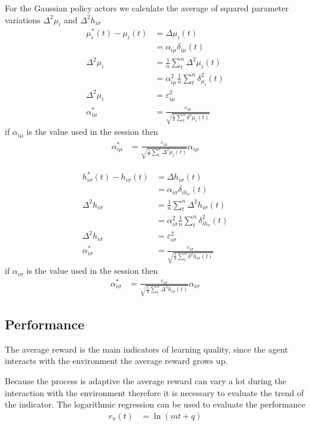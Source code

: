 \documentclass[]{article}
\begin{document}
For the Gaussian policy actors we calculate the average of squared parameter variations $ \Delta^2\mu_i$ and $ \Delta^2 h_{i\sigma} $
\begin{align*}
	\mu^*_i(t) - \mu_i(t)&=	\Delta \mu_i(t)
	\\
	&=	\alpha_{i\mu} \delta_{i\mu}(t)
	\\
	\Delta^2\mu_{i}&=			\frac{1}{n} \sum_t^n \Delta^2 \mu_i(t)
	\\
	&=	\alpha^2_{i\mu}\frac{1}{n}\sum_t^n  \delta^2_{\mu_{i}}(t)
	\\
	\Delta^2\mu_i &=	\varepsilon^2_{i\mu}
	\\
	\alpha^*_{i\mu}&=	\frac{\varepsilon_{i\mu}}{\sqrt{\frac{1}{n} \sum_t^n \delta^2 \mu_i(t)}}
\end{align*}
if $ \alpha_{i\mu} $ is the value used in the session then
\begin{align}
	\alpha^*_{i\mu}&=	\frac{\varepsilon_{i\mu}}{\sqrt{\frac{1}{n} \sum_t^n  \Delta^2 \mu_i(t)}} \alpha_{i\mu}
\end{align}

\begin{align*}
	h^*_{i\sigma}(t) - h_{i\sigma}(t)&=	\Delta h_{i\sigma}(t)
	\\
	&=	\alpha_{i\sigma} \delta_{ih_\sigma}(t)
	\\
	\Delta^2h_{i\sigma}&=			\frac{1}{n} \sum_t^n \Delta^2 h_{i\sigma}(t)
	\\
	&=	\alpha^2_{i\sigma}\frac{1}{n}\sum_t^n  \delta^2_{ih_\sigma}(t)
	\\
	\Delta^2h_{i\sigma} &=	\varepsilon^2_{i\sigma}
	\\
	\alpha^*_{i\sigma}&=	\frac{\varepsilon_{i\sigma}}{\sqrt{\frac{1}{n} \sum_t^n \delta^2 h_{i\sigma}(t)}}
\end{align*}
if $ \alpha_{i\sigma} $ is the value used in the session then
\begin{align}
	\alpha^*_{i\sigma}&=	\frac{\varepsilon_{i\sigma}}{\sqrt{\frac{1}{n} \sum_t^n  \Delta^2 h_{i\sigma}(t)}} \alpha_{i\sigma}
\end{align}

\subsection{Performance}

The average reward is the main indicators of learning quality, since the agent interacts with the environment the average reward grows up.

Because the process is adaptive the average reward can vary a lot during the interaction with the environment therefore it is necessary to evaluate the trend of the indicator. The logarithmic regression can be used to evaluate the performance
\begin{align}
	r_\pi(t) & = \ln (mt + q)
\end{align}
\end{document}
